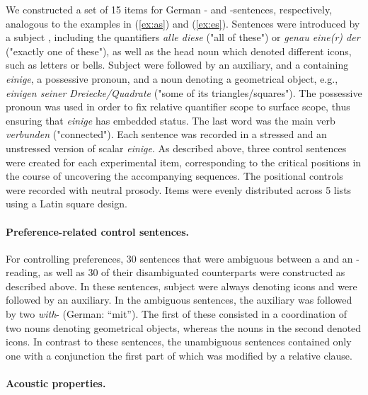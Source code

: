 \documentclass[fleqn,reqno,10pt]{article}
\newcommand{\as}{\acro{as}}
\renewcommand{\es}{\acro{es}}
\newcommand{\lc}{\acro{lc}}
\newcommand{\ec}{\acro{ec}}
\begin{document}
We constructed a set of 15 items for German \as- and \es-sentences,
respectively, analogous to the examples in (\ref{ex:as}) and
(\ref{ex:es}). Sentences were introduced by a subject {},
including the quantifiers {\it alle diese} ("all of these") or {\it
  genau eine(r) der} ("exactly one of these"), as well as the head
noun which denoted different icons, such as letters or bells. Subject 
were followed by an auxiliary, and a  containing {\it
  einige}, a possessive pronoun, and a noun denoting a geometrical
object, e.g., {\it einigen seiner Dreiecke/Quadrate} ("some of its
triangles/squares"). The possessive pronoun was used in order to fix
relative quantifier scope to surface scope, thus ensuring that {\it
  einige} has embedded status. The last word was the main verb {\it
  verbunden} ("connected").  Each sentence was recorded in a stressed
and an unstressed version of scalar {\it einige}. As described above,
three control sentences were created for each experimental item,
corresponding to the critical positions in the course of uncovering
the accompanying sequences.  The positional controls were recorded
with neutral prosody.  Items were evenly distributed across 5 lists
using a Latin square design.


\paragraph{Preference-related control sentences.}
For controlling preferences, 30 sentences that were ambiguous between
a \lc and an \ec-reading, as well as 30 of their disambiguated
counterparts were constructed as described above. In these sentences,
subject  were always denoting icons and were followed by an
auxiliary. In the ambiguous sentences, the auxiliary was followed by
two {\it with}- (German: ``mit'').  The first of these
 consisted in a coordination of two nouns denoting
geometrical objects, whereas the nouns in the second  denoted
icons. In contrast to these sentences, the unambiguous sentences
contained only one  with a conjunction the first part of
which was modified by a relative clause.

\paragraph{Acoustic properties.}
\end{document}
